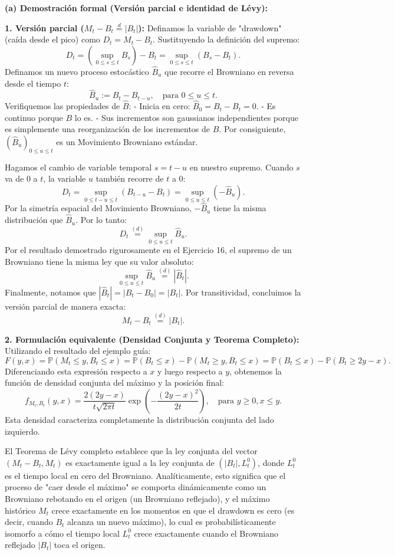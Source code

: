 \documentclass[11pt, letterpaper]{article}
\begin{document}
\begin{solucion}
    \vspace{3mm}
    \textbf{(a) Demostración formal (Versión parcial e identidad de Lévy):}

    \textbf{1. Versión parcial ($M_t - B_t \stackrel{d}{=} |B_t|$):}
    Definamos la variable de "drawdown" (caída desde el pico) como $D_t = M_t - B_t$.
    Sustituyendo la definición del supremo:
    \[ D_t = \left( \sup_{0 \le s \le t} B_s \right) - B_t = \sup_{0 \le s \le t} (B_s - B_t). \]
    Definamos un nuevo proceso estocástico $\hat{B}_u$ que recorre el Browniano en reversa desde el tiempo $t$:
    \[ \hat{B}_u := B_t - B_{t-u}, \quad \text{para } 0 \le u \le t. \]
    Verifiquemos las propiedades de $\hat{B}$:
    - Inicia en cero: $\hat{B}_0 = B_t - B_t = 0$.
    - Es continuo porque $B$ lo es.
    - Sus incrementos son gaussianos independientes porque es simplemente una reorganización de los incrementos de $B$.
    Por consiguiente, $(\hat{B}_u)_{0 \le u \le t}$ es un Movimiento Browniano estándar.
    
    Hagamos el cambio de variable temporal $s = t - u$ en nuestro supremo. Cuando $s$ va de $0$ a $t$, la variable $u$ también recorre de $t$ a $0$:
    \[ D_t = \sup_{0 \le t-u \le t} (B_{t-u} - B_t) = \sup_{0 \le u \le t} (-\hat{B}_u). \]
    Por la simetría espacial del Movimiento Browniano, $-\hat{B}_u$ tiene la misma distribución que $\hat{B}_u$. Por lo tanto:
    \[ D_t \stackrel{(d)}{=} \sup_{0 \le u \le t} \hat{B}_u. \]
    Por el resultado demostrado rigurosamente en el Ejercicio 16, el supremo de un Browniano tiene la misma ley que su valor absoluto:
    \[ \sup_{0 \le u \le t} \hat{B}_u \stackrel{(d)}{=} |\hat{B}_t|. \]
    Finalmente, notamos que $|\hat{B}_t| = |B_t - B_0| = |B_t|$. Por transitividad, concluimos la versión parcial de manera exacta:
    \[ M_t - B_t \stackrel{(d)}{=} |B_t|. \]

    \textbf{2. Formulación equivalente (Densidad Conjunta y Teorema Completo):}
    Utilizando el resultado del ejemplo guía:
    \[ F(y,x) = \mathbb{P}(M_t \le y, B_t \le x) = \mathbb{P}(B_t \le x) - \mathbb{P}(M_t \ge y, B_t \le x) = \mathbb{P}(B_t \le x) - \mathbb{P}(B_t \ge 2y - x). \]
    Diferenciando esta expresión respecto a $x$ y luego respecto a $y$, obtenemos la función de densidad conjunta del máximo y la posición final:
    \[ f_{M_t, B_t}(y, x) = \frac{2(2y - x)}{t\sqrt{2\pi t}} \exp\left( -\frac{(2y - x)^2}{2t} \right), \quad \text{para } y \ge 0, x \le y. \]
    Esta densidad caracteriza completamente la distribución conjunta del lado izquierdo.
    
    El Teorema de Lévy completo establece que la ley conjunta del vector $(M_t - B_t, M_t)$ es exactamente igual a la ley conjunta de $(|B_t|, L_t^0)$, donde $L_t^0$ es el tiempo local en cero del Browniano. 
    Analíticamente, esto significa que el proceso de "caer desde el máximo" se comporta dinámicamente como un Browniano rebotando en el origen (un Browniano reflejado), y el máximo histórico $M_t$ crece exactamente en los momentos en que el drawdown es cero (es decir, cuando $B_t$ alcanza un nuevo máximo), lo cual es probabilísticamente isomorfo a cómo el tiempo local $L_t^0$ crece exactamente cuando el Browniano reflejado $|B_t|$ toca el origen.
\end{solucion}
\end{document}

